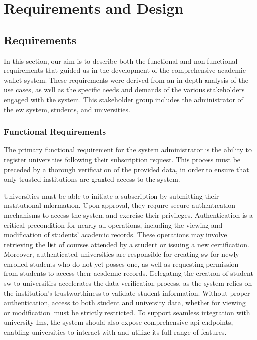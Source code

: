 \chapter{Requirements and Design}

\section{Requirements}
In this section, our aim is to describe both the functional and non-functional requirements that guided us in the development of the comprehensive academic wallet system. These requirements were derived from an in-depth analysis of the use cases, as well as the specific needs and demands of the various stakeholders engaged with the system. This stakeholder group includes the administrator of the \acrlong{ew} system, students, and universities.

\subsection{Functional Requirements}
The primary functional requirement for the system administrator is the ability to register universities following their subscription request. This process must be preceded by a thorough verification of the provided data, in order to ensure that only trusted institutions are granted access to the system.

Universities must be able to initiate a subscription by submitting their institutional information. Upon approval, they require secure authentication mechanisms to access the system and exercise their privileges. Authentication is a critical precondition for nearly all operations, including the viewing and modification of students' academic records. These operations may involve retrieving the list of courses attended by a student or issuing a new certification. Moreover, authenticated universities are responsible for creating \acrlong{sw} for newly enrolled students who do not yet posses one, as well as requesting permission from students to access their academic records. Delegating the creation of student \acrshort{sw} to universities accelerates the data verification process, as the system relies on the institution's trustworthiness to validate student information. Without proper authentication, access to both student and university data, whether for viewing or modification, must be strictly restricted. To support seamless integration with university \acrshort{lms}, the system should also expose comprehensive \acrshort{api} endpoints, enabling universities to interact with and utilize its full range of features.

